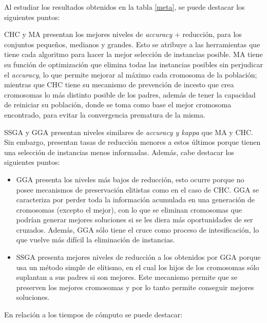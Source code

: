 Al estudiar los resultados obtenidos en la tabla \ref{meta}, se puede destacar los siguientes puntos:

CHC y MA presentan los mejores niveles de \emph{accuracy} + reducción, para los conjuntos pequeños, medianos y grandes. Esto se atribuye a las herramientas que tiene cada algoritmo para hacer la mejor selección de instancias posible. MA tiene su función de optimización que elimina todas las instancias posibles sin perjudicar el \emph{accuracy}, lo que permite mejorar al máximo cada cromosoma de la población; mientras que CHC tiene su mecanismo de prevención de incesto que crea cromosomas lo más distinto posible de los padres, además de tener la capacidad de reiniciar su población, donde se toma como base el mejor cromosoma encontrado, para evitar la convergencia prematura de la misma.

SSGA y GGA presentan niveles similares de \emph{accuracy y kappa} que MA y CHC. Sin embargo, presentan tasas de reducción menores a estos últimos porque tienen una selección de instancias menos informadas. Además, cabe destacar los siguientes puntos:

\begin{itemize}

\item GGA presenta los niveles más bajos de reducción, esto ocurre porque no posee mecanismos de preservación elitistas como en el caso de CHC. GGA se caracteriza por perder toda la información acumulada en una generación de cromosomas (excepto el mejor), con lo que se eliminan cromosomas que podrían generar mejores soluciones si se les diera más oportunidades de ser cruzados. Además, GGA sólo tiene el cruce como proceso de intesificación, lo que vuelve más difícil la eliminación de instancias.

\item SSGA presenta mejores niveles de reducción a los obtenidos por GGA porque usa un método simple de elitismo, en el cual los hijos de los cromosomas sólo suplantan a sus padres si son mejores. Este mecanismo permite que se preserven los mejores cromosomas y por lo tanto permite conseguir mejores soluciones.

\end{itemize}


En relación a los tiempos de cómputo se puede destacar:

